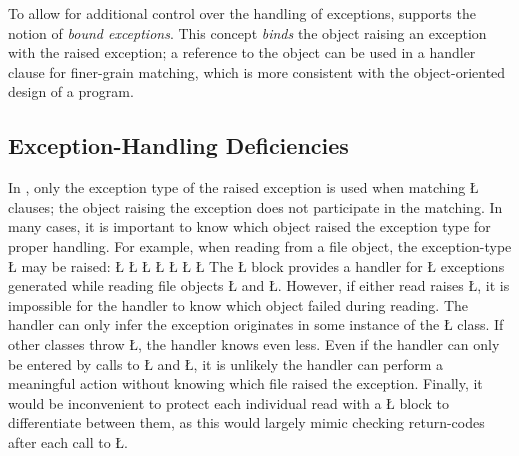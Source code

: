 \documentclass[openright,twoside]{report}
\begin{document}
To allow for additional control over the handling of exceptions, \uC supports the notion of \emph{bound exceptions}. 
This concept \emph{binds} the object raising an exception with the raised exception;
a reference to the object can be used in a handler clause for finer-grain matching, which is more consistent with the object-oriented design of a program.


\subsection{\texorpdfstring{\CC Exception-Handling Deficiencies}{C++ Exception-Handling Deficiencies}}

In \CC, only the exception type of the raised exception is used when matching \LGinlinetrue\LGbegin\lgrinde\L{}\endlgrinde\LGend{} clauses;
the object raising the exception does not participate in the matching.
In many cases, it is important to know which object raised the exception type for proper handling.
For example, when reading from a file object, the exception-type \LGinlinetrue\LGbegin\lgrinde\L{}\endlgrinde\LGend{} may be raised:
\LGinlinefalse\LGbegin\lgrinde
\L{}
\L{}
\L{\LB{}}
\L{\LB{}}
\L{}
\L{\LB{}}
\CE{}\L{\LB{\}}}
\endlgrinde\LGend
The \LGinlinetrue\LGbegin\lgrinde\L{}\endlgrinde\LGend{} block provides a handler for \LGinlinetrue\LGbegin\lgrinde\L{}\endlgrinde\LGend{} exceptions generated while reading file objects \LGinlinetrue\LGbegin\lgrinde\L{}\endlgrinde\LGend{} and \LGinlinetrue\LGbegin\lgrinde\L{}\endlgrinde\LGend{}.
However, if either read raises \LGinlinetrue\LGbegin\lgrinde\L{}\endlgrinde\LGend{}, it is impossible for the handler to know which object failed during reading.
The handler can only infer the exception originates in some instance of the \LGinlinetrue\LGbegin\lgrinde\L{}\endlgrinde\LGend{} class.
If other classes throw \LGinlinetrue\LGbegin\lgrinde\L{}\endlgrinde\LGend{}, the handler knows even less.
Even if the handler can only be entered by calls to \LGinlinetrue\LGbegin\lgrinde\L{}\endlgrinde\LGend{} and \LGinlinetrue\LGbegin\lgrinde\L{}\endlgrinde\LGend{}, it is unlikely the handler can perform a meaningful action without knowing which file raised the exception.
Finally, it would be inconvenient to protect each individual read with a \LGinlinetrue\LGbegin\lgrinde\L{}\endlgrinde\LGend{} block to differentiate between them, as this would largely mimic checking return-codes after each call to \LGinlinetrue\LGbegin\lgrinde\L{}\endlgrinde\LGend{}.
\end{document}
